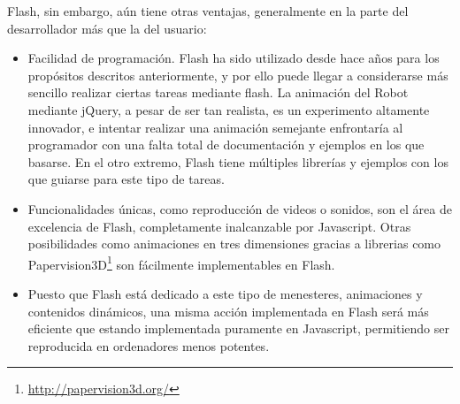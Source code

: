 Flash, sin embargo, aún tiene otras ventajas, generalmente en la parte del desarrollador más que la del usuario:

\begin{itemize}
  \item Facilidad de programación. Flash ha sido utilizado desde hace años para los propósitos descritos anteriormente, y por ello puede llegar a considerarse más sencillo realizar ciertas tareas mediante flash. La animación del Robot mediante jQuery, a pesar de ser tan realista, es un experimento altamente innovador, e intentar realizar una animación semejante enfrontaría al programador con una falta total de documentación y ejemplos en los que basarse. En el otro extremo, Flash tiene múltiples librerías y ejemplos con los que guiarse para este tipo de tareas.
  \item Funcionalidades únicas, como reproducción de videos o sonidos, son el área de excelencia de Flash, completamente inalcanzable por Javascript. Otras posibilidades como animaciones en tres dimensiones gracias a librerias como Papervision3D\footnote{\url{http://papervision3d.org/}} son fácilmente implementables en Flash.
  \item Puesto que Flash está dedicado a este tipo de menesteres, animaciones y contenidos dinámicos, una misma acción implementada en Flash será más eficiente que estando implementada puramente en Javascript, permitiendo ser reproducida en ordenadores menos potentes.
\end{itemize}


